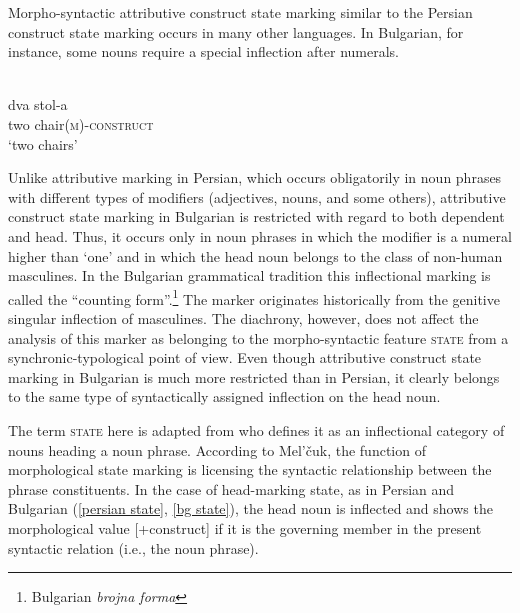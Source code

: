 Morpho-syntactic attributive construct state marking similar to the Persian construct state marking occurs in many other languages. In Bulgarian, for instance, some nouns require a special inflection after numerals.

\newpage

\begin{exe}
\ex 
{}\\
\label{bg state}
\gll 	dva 	stol-a\\
	two	chair{\textsc{(m)-construct}}\\
\glt 	‘two chairs’
\end{exe}

Unlike attributive  marking in Persian, which occurs obligatorily in noun phrases with different types of modifiers (adjectives, nouns, and some others), attributive construct state marking in Bulgarian is restricted with regard to both dependent and head. Thus, it occurs only in noun phrases in which the modifier is a numeral higher than ‘one’ and in which the head noun belongs to the class of non-human masculines. In the Bulgarian grammatical tradition this inflectional marking is called the “counting form”.\footnote{Bulgarian \textit{brojna forma}} The marker originates historically from the genitive singular inflection of masculines. The diachrony, however, does not affect the analysis of this marker as belonging to the morpho-syntactic feature \textsc{state} from a synchronic-typological point of view. Even though attributive construct state marking in Bulgarian is much more restricted than in Persian, it clearly belongs to the same type of syntactically assigned inflection on the head noun.

The term \textsc{state} here is adapted from \citet[114–116]{melcuk2006} who defines it as an inflectional category of nouns heading a noun phrase. According to Mel'čuk, the function of morphological state marking is licensing the syntactic relationship between the phrase constituents. In the case of head-marking state, as in Persian and Bulgarian (\ref{persian state}, \ref{bg state}), the head noun is inflected and shows the morphological value [+construct] if it is the governing member in the present syntactic relation (i.e., the noun phrase). 

